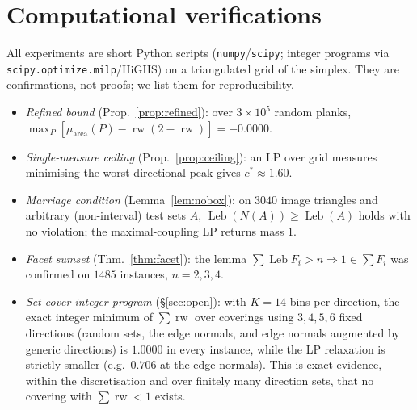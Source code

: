 \documentclass[11pt]{article}
\theoremstyle{plain}
\theoremstyle{remark}
\newcommand{\rw}{\operatorname{rw}}
\newcommand{\Leb}{\operatorname{Leb}}
\begin{document}
\section{Computational verifications}\label{app:comp}
All experiments are short Python scripts (\texttt{numpy}/\texttt{scipy};
integer programs via \texttt{scipy.optimize.milp}/HiGHS) on a triangulated grid of
the simplex. They are confirmations, not proofs; we list them for reproducibility.
\begin{itemize}
\item \emph{Refined bound} (Prop.~\ref{prop:refined}): over $3\times10^5$ random
planks, $\max_P[\mu_{\mathrm{area}}(P)-\rw(2-\rw)]=-0.0000$.
\item \emph{Single-measure ceiling} (Prop.~\ref{prop:ceiling}): an LP over
grid measures minimising the worst directional peak gives $c^\ast\approx1.60$.
\item \emph{Marriage condition} (Lemma~\ref{lem:nobox}): on $3040$ image triangles
and arbitrary (non-interval) test sets $A$, $\Leb(N(A))\ge\Leb(A)$ holds with no
violation; the maximal-coupling LP returns mass $1$.
\item \emph{Facet sumset} (Thm.~\ref{thm:facet}): the lemma $\sum\Leb F_i>n
\Rightarrow 1\in\sum F_i$ was confirmed on $1485$ instances, $n=2,3,4$.
\item \emph{Set-cover integer program} (\S\ref{sec:open}): with $K=14$ bins per
direction, the exact integer minimum of $\sum\rw$ over coverings using $3,4,5,6$
fixed directions (random sets, the edge normals, and edge normals augmented by
generic directions) is $1.0000$ in every instance, while the LP relaxation is
strictly smaller (e.g.\ $0.706$ at the edge normals). This is exact evidence,
within the discretisation and over finitely many direction sets, that no covering
with $\sum\rw<1$ exists.
\end{itemize}
\end{document}
